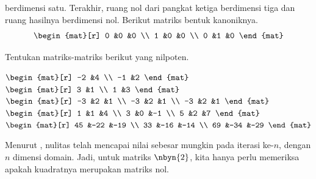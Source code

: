 \begin{exercises}
\begin{answer}
\begin{exparts}
          berdimensi satu.
          Terakhir, ruang nol dari pangkat ketiga berdimensi tiga
          dan ruang hasilnya
          berdimensi nol.
          Berikut matriks bentuk kanoniknya.
          \begin{equation*}
            \begin{mat}[r]
              0  &0  &0  \\
              1  &0  &0  \\
              0  &1  &0 
            \end{mat}
          \end{equation*}
      \end{exparts}
    \end{answer}
  \item 
    Tentukan matriks-matriks berikut yang nilpoten.
    \begin{exparts*}
      \partsitem 
        $\begin{mat}[r]
           -2  &4  \\
           -1  &2
        \end{mat}$
      \partsitem 
        $\begin{mat}[r]
          3  &1  \\
          1  &3
        \end{mat}$
      \partsitem 
        $\begin{mat}[r]
          -3  &2  &1  \\
          -3  &2  &1  \\
          -3  &2  &1
        \end{mat}$
      \partsitem 
        $\begin{mat}[r]
           1  &1  &4  \\
           3  &0  &-1 \\
           5  &2  &7
        \end{mat}$
      \partsitem 
        $\begin{mat}[r]
           45  &-22  &-19  \\
           33  &-16  &-14  \\
           69  &-34  &-29
        \end{mat}$
    \end{exparts*}
    \begin{answer}
      Menurut , nulitas telah mencapai
      nilai sebesar mungkin pada iterasi ke-$n$, dengan $n$ dimensi domain.
      Jadi, untuk matriks $\nbyn{2}$,
      kita hanya perlu memeriksa apakah kuadratnya merupakan matriks nol.

\end{answer}
\end{exercises}
